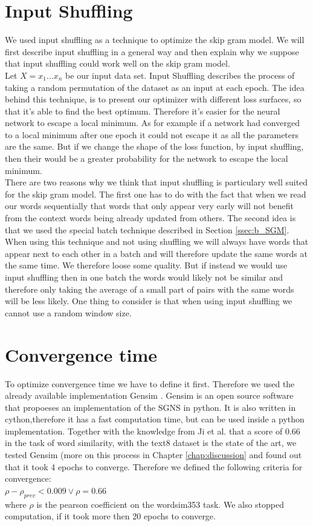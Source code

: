 \section{Input Shuffling}
We used input shuffling as a technique to optimize the skip gram model. We will first describe input shuffling in a general way and then explain why we suppose that input shuffling could work well on the skip gram model. \\
Let $X = {x_1...x_n}$ be our input data set. Input Shuffling describes the process of taking a random permutation of the dataset as an input at each epoch. 
The idea behind this technique, is  to present our optimizer with different loss surfaces, so that it's able to find the best optimum. Therefore it's easier for the neural network to escape a local minimum. As for example if a network had converged to a local minimum after one epoch it could not escape it as all the parameters are the same. But if we change the shape of the loss function, by input shuffling, then their would be a greater probability for the network to escape the local minimum.
\\
There are two reasons why we think that input shuffling is particulary well suited for the skip gram model. The first one has to do with the fact that when we read our words sequentially that words that only appear very early will not benefit from the context words being already updated from others. The second idea is that we used the special batch technique described in Section \ref{ssec:b_SGM}. When using this technique and not using shuffling we will always have words that appear next to each other in a batch and will therefore update the same words at the same time. We therefore loose some quality. But if instead we would use input shuffling then in one batch the words would likely not be similar and therefore only taking the average of a small part of pairs with the same words will be less likely. 
One thing to consider is that when using input shuffling we cannot use a random window size. 

\section{Convergence time} 
To optimize convergence time we have to define it first. Therefore we used the already available implementation Gensim \cite{gensim}. Gensim is an open source software that propoeses an implementation of the SGNS in python. It is also written in cython,therefore it has a fast computation time, but can be used inside a python implementation. Together with the knowledge from Ji et al.\cite{intel} that a score of $0.66$ in the task of word similarity, with the text8 dataset is the state of the art, we tested Gensim (more on this process in Chapter \ref{chap:discussion} and found out  that it took 4 epochs to converge. Therefore we defined the following criteria for convergence: \\
$\rho - \rho_{prev} < 0.009 \vee \rho = 0.66$ \\
where $\rho$ is the pearson coefficient on the wordsim353 task. 
We also stopped computation, if it took more then 20 epochs to converge. 

